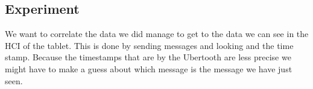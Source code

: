 \subsection{Experiment}
\label{subsec:experiment}
We want to correlate the data we did manage to get to the data we can see in the HCI of the tablet. This is done by sending messages and looking and the time stamp. Because the timestamps that are by the Ubertooth are less precise we might have to make a guess about which message is the message we have just seen.

